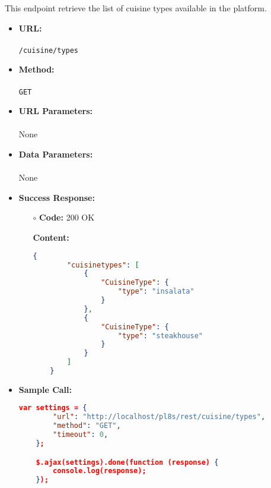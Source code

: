 

This endpoint retrieve the list of cuisine types available in the platform.

\begin{itemize}
    \item \textbf{URL:} \\\\\texttt{/cuisine/types}
    \item \textbf{Method:} \\\\\texttt{GET}
    \item \textbf{URL Parameters:} \\\\None
    \item \textbf{Data Parameters:} \\\\None
    \item \textbf{Success Response:}
		\begin{itemize}
			\item[$\circ$] \textbf{Code:} 200 OK
			\item[] \textbf{Content:}
			\begin{lstlisting}[language=json]
	{
	    "cuisinetypes": [
	        {
	            "CuisineType": {
	                "type": "insalata"
	            }
	        },
	        {
	            "CuisineType": {
	                "type": "steakhouse"
	            }
	        }
	    ]
	}
			\end{lstlisting}
		\end{itemize}
	
    \item \textbf{Sample Call:}
		\medskip
		\begin{lstlisting}[language=json]
	var settings = {
		"url": "http://localhost/pl8s/rest/cuisine/types",
		"method": "GET",
		"timeout": 0,
	};

	$.ajax(settings).done(function (response) {
		console.log(response);
	});
		\end{lstlisting}
    
\end{itemize}
